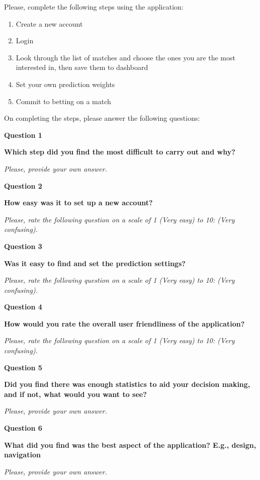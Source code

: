 Please, complete the following steps using the application: 

\begin{enumerate}
   \item Create a new account 
   \item Login 
   \item Look through the list of matches and choose the ones you are the most interested in, then save them to dashboard
   \item Set your own prediction weights 
   \item Commit to betting on a match
\end{enumerate}

On completing the steps, please answer the following questions:

\textbf{Question 1}\par
\textbf{Which step did you find the most difficult to carry out and why?}\par
\emph{Please, provide your own answer.}
 
\textbf{Question 2}\par
\textbf{How easy was it to set up a new account?}\par
\emph{Please, rate the following question on a scale of 1 (Very easy) to 10:  (Very confusing).}
 
\textbf{Question 3}\par
\textbf{Was it easy to find and set the prediction settings?}\par
 \emph{Please, rate the following question on a scale of 1 (Very easy) to 10:  (Very confusing).}
  
\textbf{Question 4}\par
\textbf{How would you rate the overall user friendliness of the application?}\par
 \emph{Please, rate the following question on a scale of 1 (Very easy) to 10:  (Very confusing). }
 
 \textbf{Question 5}\par
\textbf{Did you find there was enough statistics to aid your decision making, and if not, what would you want to see?}\par
\emph{Please, provide your own answer.}
 
 \textbf{Question 6}\par
\textbf{What did you find was the best aspect of the application? E.g., design, navigation}\par
\emph{Please, provide your own answer.}

